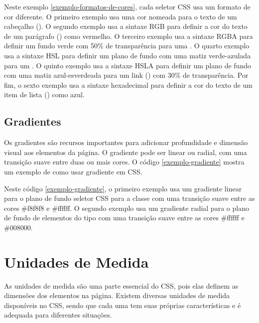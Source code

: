 Neste exemplo \ref{exemplo-formatos-de-cores}, cada seletor CSS usa um formato de cor diferente. O primeiro exemplo usa uma cor nomeada  para o texto de um cabeçalho (). O segundo exemplo usa a sintaxe RGB para definir a cor do texto de um parágrafo () como vermelho. O terceiro exemplo usa a sintaxe RGBA para definir um fundo verde com 50\% de transparência para uma . O quarto exemplo usa a sintaxe HSL para definir um plano de fundo com uma matiz verde-azulada para um . O quinto exemplo usa a sintaxe HSLA para definir um plano de fundo com uma matiz azul-esverdeada para um link () com 30\% de transparência. Por fim, o sexto exemplo usa a sintaxe hexadecimal para definir a cor do texto de um item de lista () como azul.

\subsection{Gradientes}

Os gradientes são recursos importantes para adicionar profundidade e dimensão visual aos elementos da página. O gradiente pode ser linear ou radial, com uma transição suave entre duas ou mais cores. O código \ref{exemplo-gradiente} mostra um exemplo de como usar gradiente em CSS.


Neste código \ref{exemplo-gradiente}, o primeiro exemplo usa um gradiente linear para o plano de fundo seletor CSS para a classe  com uma transição suave entre as cores \#f8f8f8 e \#ffffff. O segundo exemplo usa um gradiente radial para o plano de fundo de elementos do tipo  com uma transição suave entre as cores \#ffffff e \#008000.

\section{Unidades de Medida}

As unidades de medida são uma parte essencial do CSS, pois elas definem as dimensões dos elementos na página. Existem diversas unidades de medida disponíveis no CSS, sendo que cada uma tem suas próprias características e é adequada para diferentes situações.

